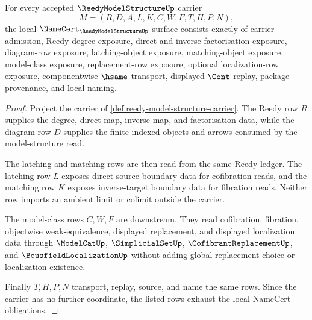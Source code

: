 \begin{theorem}
\label{thm:reedy-model-structure-namecert-obligations}
For every accepted $\ReedyModelStructureUp$ carrier
$$
M=(R,D,A,L,K,C,W,F,T,H,P,N),
$$
the local $\NameCert_{\ReedyModelStructureUp}$ surface consists exactly of carrier admission, Reedy degree exposure, direct and inverse factorisation exposure, diagram-row exposure, latching-object exposure, matching-object exposure, model-class exposure, replacement-row exposure, optional localization-row exposure, componentwise $\hsame$ transport, displayed $\Cont$ replay, package provenance, and local naming.
\end{theorem}
\begin{proof}
Project the carrier of \autoref{def:reedy-model-structure-carrier}. The Reedy row $R$ supplies the degree, direct-map, inverse-map, and factorisation data, while the diagram row $D$ supplies the finite indexed objects and arrows consumed by the model-structure read.

The latching and matching rows are then read from the same Reedy ledger. The latching row $L$ exposes direct-source boundary data for cofibration reads, and the matching row $K$ exposes inverse-target boundary data for fibration reads. Neither row imports an ambient limit or colimit outside the carrier.

The model-class rows $C,W,F$ are downstream. They read cofibration, fibration, objectwise weak-equivalence, displayed replacement, and displayed localization data through $\ModelCatUp$, $\SimplicialSetUp$, $\CofibrantReplacementUp$, and $\BousfieldLocalizationUp$ without adding global replacement choice or localization existence.

Finally $T,H,P,N$ transport, replay, source, and name the same rows. Since the carrier has no further coordinate, the listed rows exhaust the local NameCert obligations.
\end{proof}

